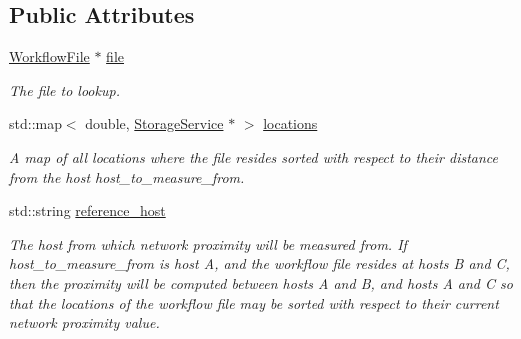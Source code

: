 \subsection*{Public Attributes}
\begin{DoxyCompactItemize}
\item 
\mbox{\label{classwrench_1_1_file_registry_file_lookup_by_proximity_answer_message_af2715215a2126aef33bc74809d61fc54}} 
\hyperlink{classwrench_1_1_workflow_file}{Workflow\+File} $\ast$ \hyperlink{classwrench_1_1_file_registry_file_lookup_by_proximity_answer_message_af2715215a2126aef33bc74809d61fc54}{file}
\begin{DoxyCompactList}\small\item\em The file to lookup. \end{DoxyCompactList}\item 
\mbox{\label{classwrench_1_1_file_registry_file_lookup_by_proximity_answer_message_afd27d56abf5c464405ec7cbb26af69a2}} 
std\+::map$<$ double, \hyperlink{classwrench_1_1_storage_service}{Storage\+Service} $\ast$ $>$ \hyperlink{classwrench_1_1_file_registry_file_lookup_by_proximity_answer_message_afd27d56abf5c464405ec7cbb26af69a2}{locations}
\begin{DoxyCompactList}\small\item\em A map of all locations where the file resides sorted with respect to their distance from the host \textquotesingle{}host\+\_\+to\+\_\+measure\+\_\+from\textquotesingle{}. \end{DoxyCompactList}\item 
\mbox{\label{classwrench_1_1_file_registry_file_lookup_by_proximity_answer_message_a91a458a389b51fc43095d72305223b1a}} 
std\+::string \hyperlink{classwrench_1_1_file_registry_file_lookup_by_proximity_answer_message_a91a458a389b51fc43095d72305223b1a}{reference\+\_\+host}
\begin{DoxyCompactList}\small\item\em The host from which network proximity will be measured from. If \textquotesingle{}host\+\_\+to\+\_\+measure\+\_\+from\textquotesingle{} is host \textquotesingle{}A\textquotesingle{}, and the workflow file resides at hosts \textquotesingle{}B\textquotesingle{} and \textquotesingle{}C\textquotesingle{}, then the proximity will be computed between hosts \textquotesingle{}A\textquotesingle{} and \textquotesingle{}B\textquotesingle{}, and hosts \textquotesingle{}A\textquotesingle{} and \textquotesingle{}C\textquotesingle{} so that the locations of the workflow file may be sorted with respect to their current network proximity value. \end{DoxyCompactList}\end{DoxyCompactItemize}
